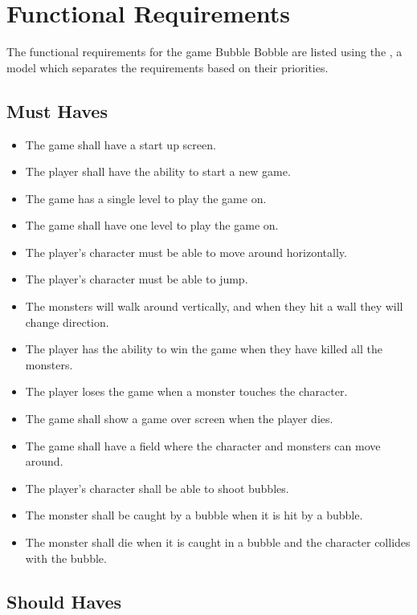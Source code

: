 \chapter{Functional Requirements}

The functional requirements for the game Bubble Bobble are listed using the , a model which separates the requirements based on their priorities.

\section{Must Haves}

\begin{itemize}
\itemsep0em 
 	\item The game shall have a start up screen.
  	\item The player shall have the ability to start a new game.
  	\item The game has a single level to play the game on.
  	\item The game shall have one level to play the game on.
  	\item The player's character must be able to move around horizontally.
  	\item The player's character must be able to jump.
  	\item The monsters will walk around vertically, and when they hit a wall they will change direction. 
 	\item The player has the ability to win the game when they have killed all the monsters.
 	\item The player loses the game when a monster touches the character.
 	\item The game shall show a game over screen when the player dies.
 	\item The game shall have a field where the character and monsters can move around.
 	\item The player's character shall be able to shoot bubbles.
 	\item The monster shall be caught by a bubble when it is hit by a bubble.
 	\item The monster shall die when it is caught in a bubble and the character collides with the bubble.
\end{itemize}

\section{Should Haves}

